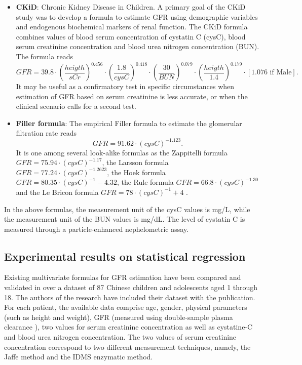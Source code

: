 \documentclass[10pt,final]{siamltex}
\begin{document}
\begin{itemize}
  \item \textbf{CKiD}: Chronic Kidney Disease in Children. A primary goal of the CKiD study was to develop a formula to estimate GFR using demographic variables and endogenous biochemical markers of renal function. The CKiD formula combines values of blood serum concentration of cystatin C (cysC), blood serum creatinine concentration and blood urea nitrogen concentration (BUN). The formula reads
  \begin{equation}
    \mathit{GFR} = 39.8 \cdot \left(\frac{heigth}{sCr}\right)^{0.456} \cdot \left(\frac{1.8}{cysC}\right)^{0.418} \cdot \left(\frac{30}{\textit{BUN}}\right)^{0.079} \cdot \left(\frac{heigth}{1.4}\right)^{0.179}\cdot [1.076 \text{ if Male}].
  \end{equation}
  It may be useful as a confirmatory test in specific circumstances when estimation of GFR based on serum creatinine is less accurate, or when the clinical scenario calls for a second test\cite{grubb,schwartz3}.

  \item \textbf{Filler formula}: The empirical Filler formula to estimate the glomerular filtration rate reads
  \begin{equation}
    \textit{GFR} = 91.62 \cdot (cysC)^{-1.123}.
  \end{equation}
  It is one among several look-alike formulas as the Zappitelli formula $\textit{GFR} = 75.94 \cdot (cysC)^{-1.17}$, the Larsson formula $\textit{GFR} = 77.24 \cdot (cysC)^{-1.2623}$, the Hoek formula $\textit{GFR} = 80.35 \cdot (cysC)^{-1} - 4.32$, the Rule formula $\textit{GFR} = 66.8 \cdot (cysC)^{-1.30}$ and the Le Bricon formula $\textit{GFR} = 78 \cdot (cysC)^{-1} + 4$ \cite{laskin}.
\end{itemize}
%

In the above formulas, the measurement unit of the cysC values is mg/L, while the measurement unit of the BUN values is mg/dL. The level of cystatin C is measured through a particle-enhanced nephelometric assay.
%
\subsection{Experimental results on statistical regression}
%
Existing multivariate formulas for GFR estimation have been compared and validated in \cite{gfr} over a dataset of 87 Chinese children and adolescents aged 1 through 18. The authors of the research have included their dataset with the publication. For each patient, the available data comprise age, gender, physical parameters (such as height and weight), GFR (measured using double-sample plasma clearance \cite{gold}), two values for serum creatinine concentration as well as cystatine-C and blood urea nitrogen concentration. The two values of serum creatinine concentration correspond to two different measurement techniques, namely, the Jaffe method and the IDMS enzymatic method.
\end{document}

